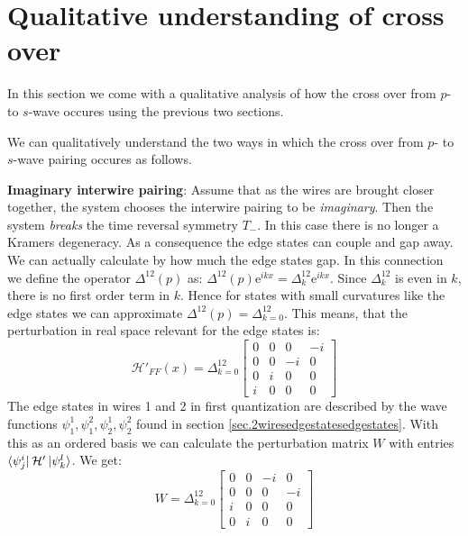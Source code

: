 \section{Qualitative understanding of cross over}
\label{sec.2wirestransitionqualitative}
In this section we come with a qualitative analysis of how the cross over from $p$- to $s$-wave occures using the previous two sections. 

We can qualitatively understand the two ways in which the cross over from $p$- to $s$-wave pairing occures as follows. 

\textbf{Imaginary interwire pairing}: Assume that as the wires are brought closer together, the system chooses the interwire pairing to be \textit{imaginary}. Then the system \textit{breaks} the time reversal symmetry $T_-$. In this case there is no longer a Kramers degeneracy. As a consequence the edge states can couple and gap away. We can actually calculate by how much the edge states gap. In this connection we define the operator $\Delta^{12}(p)$ as: $\Delta^{12}(p)\text{e}^{ikx} = \Delta^{12}_k\text{e}^{ikx}$. Since $\Delta^{12}_k$ is even in $k$, there is no first order term in $k$. Hence for states with small curvatures like the edge states we can approximate $\Delta^{12}(p) = \Delta^{12}_{k=0}$. This means, that the perturbation in real space relevant for the edge states is:
\begin{equation}
\mathcal{H}'_{FF}(x) = \Delta^{12}_{k=0}\begin{bmatrix} 
0 & 0 &  0 & -i \\
0 & 0 & -i & 0 \\
0 & i & 0  & 0 \\
i & 0 & 0  & 0  \end{bmatrix}
\label{eq.interwirepairingrealspace}
\end{equation}
The edge states in wires 1 and 2 in first quantization are described by the wave functions $\psi^1_1, \psi^2_1, \psi^1_2, \psi^2_2$ found in section \ref{sec.2wiresedgestatesedgestates}. With this as an ordered basis we can calculate the perturbation matrix $W$ with entries $\bra{\psi^{i}_j}\mathcal{H}'\ket{\psi^{l}_k}$. We get:
\begin{equation}
W = \Delta^{12}_{k=0} \begin{bmatrix} 
0 & 0 & -i &  0 \\
0 & 0 &  0 & -i \\
i & 0 &  0 & 0 \\
0 & i &  0 & 0 \end{bmatrix} \nonumber
\end{equation}  
